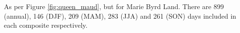 \label{fig:marie_byrd}
As per Figure \ref{fig:queen_maud}, but for Marie Byrd Land. There are 899 (annual), 146 (DJF), 209 (MAM), 283 (JJA) and 261 (SON) days included in each composite respectively.